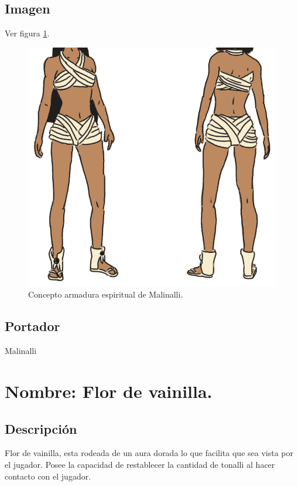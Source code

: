	\subsection{Imagen}
			Ver figura \ref{fig:armadura}.
		\begin{figure}
			\centering
			\includegraphics[height=0.2 \textheight]{Imagenes/armadura}
			\caption{Concepto armadura espiritual de Malinalli.}
			\label{fig:armadura}
		\end{figure}
	\subsection{Portador}
	Malinalli 
	
	\section{Nombre: Flor de vainilla.}\label{item:vainilla}
	\subsection{Descripción}
	Flor de vainilla, esta rodeada de un aura dorada lo que facilita que sea vista por el jugador. Posee la capacidad de restablecer la cantidad de tonalli al hacer contacto con el jugador.
